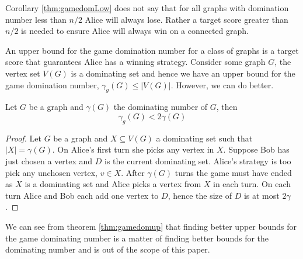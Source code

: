 Corollary \ref{thm:gamedomLow} does not say that for all graphs with domination number less than $n/2$ Alice will always lose. Rather a target score greater than $n/2$ is needed to ensure Alice will always win on a connected graph.


An upper bound for the game domination number for a class of graphs is a target score that guarantees Alice has a winning strategy. Consider some graph $G$, the vertex set $V(G)$ is a dominating set and hence we have an upper bound for the game domination number, $\gamma_g(G) \leq |V(G)|$. However, we can do better.

\begin{theorem}\label{thm:gamedomup}
    Let $G$ be a graph and $\gamma(G)$ the dominating number of $G$, then 
    \[\gamma_g(G)<2\gamma(G)\]
\end{theorem}
\begin{proof}
    Let $G$ be a graph and $X\subseteq V(G)$ a dominating set such that $|X| = \gamma(G)$. On Alice's first turn she picks any vertex in $X$. Suppose Bob has just chosen a vertex and $D$ is the current dominating set. Alice's strategy is too pick any unchosen vertex, $v\in X$. After $\gamma(G)$ turns the game must have ended as $X$ is a dominating set and Alice picks a vertex from $X$ in each turn. On each turn Alice and Bob each add one vertex to $D$, hence the size of $D$ is at most $2\gamma$.
\end{proof}

We can see from theorem \ref{thm:gamedomup} that finding better upper bounds for the game dominating number is a matter of finding better bounds for the dominating number and is out of the scope of this paper. 


